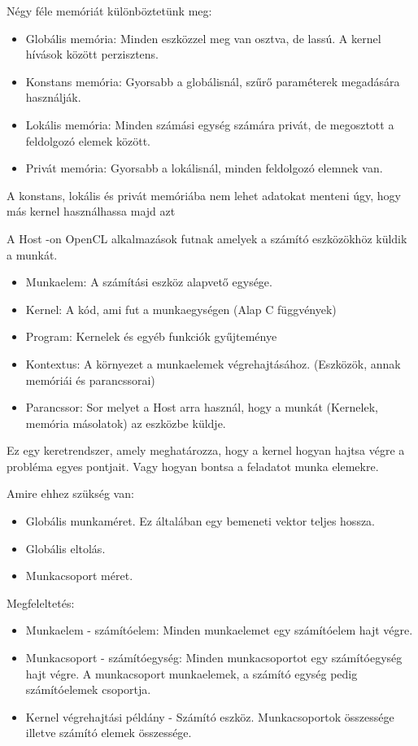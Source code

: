 Négy féle memóriát különböztetünk meg:
\begin{itemize}
\item Globális memória: Minden eszközzel meg van osztva, de lassú. A kernel hívások között perzisztens. 
\item Konstans memória: Gyorsabb a globálisnál, szűrő paraméterek megadására használják.
\item Lokális memória: Minden számási egység számára privát, de megosztott a feldolgozó elemek között.
\item Privát memória: Gyorsabb a lokálisnál, minden feldolgozó elemnek van.
\end{itemize} 
A konstans, lokális és privát memóriába nem lehet adatokat menteni úgy, hogy más kernel használhassa majd azt


A Host -on OpenCL alkalmazások futnak amelyek a számító eszközökhöz küldik a munkát.
\begin{itemize}
\item Munkaelem: A számítási eszköz alapvető egysége.
\item Kernel: A kód, ami fut a munkaegységen  (Alap C függvények)
\item Program: Kernelek és egyéb funkciók gyűjteménye
\item Kontextus: A környezet a munkaelemek végrehajtásához. (Eszközök, annak memóriái és parancssorai)
\item Parancssor: Sor melyet a Host arra használ, hogy a munkát (Kernelek, memória másolatok) az eszközbe küldje.
\end{itemize}

Ez egy keretrendszer, amely meghatározza, hogy a kernel hogyan hajtsa végre a probléma egyes pontjait. Vagy hogyan bontsa a feladatot munka elemekre.

Amire ehhez szükség van:
\begin{itemize}
\item Globális munkaméret. Ez általában egy bemeneti vektor teljes hossza.
\item Globális eltolás.
\item Munkacsoport méret.
\end{itemize}

Megfeleltetés:
\begin{itemize}
\item Munkaelem - számítóelem: Minden munkaelemet egy számítóelem hajt végre.
\item Munkacsoport - számítóegység: Minden munkacsoportot egy számítóegység hajt végre. A munkacsoport munkaelemek, a számító egység pedig számítóelemek csoportja.
\item Kernel végrehajtási példány - Számító eszköz. Munkacsoportok összessége illetve számító elemek összessége. 
\end{itemize}

